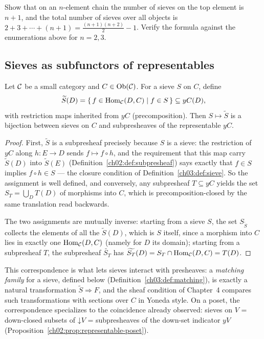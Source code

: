 \begin{exercise}\label{ch03:exr:sieve-count-chain}
Show that on an $n$-element chain the number of sieves on the top
element is $n + 1$, and the total number of sieves over all objects
is $2 + 3 + \cdots + (n+1) = \frac{(n+1)(n+2)}{2} - 1$. Verify the
formula against the enumerations above for $n = 2, 3$.
\end{exercise}

\subsection{Sieves as subfunctors of representables}\label{ch03:sec:sieve-subfunctor}

\begin{proposition}\label{ch03:prop:sieve-subfunctor}
Let $\mathcal{C}$ be a small category and $C \in \mathrm{Ob}(\mathcal{C})$. For a sieve $S$
on $C$, define
\[
\widetilde{S}(D) = \{\, f \in \mathrm{Hom}_{\mathcal{C}}(D, C) \mid f \in S \,\}
\subseteq yC(D),
\]
with restriction maps inherited from $yC$ (precomposition). Then
$S \mapsto \widetilde{S}$ is a bijection between sieves on $C$ and
subpresheaves of the representable $yC$.
\end{proposition}

\begin{proof}
First, $\widetilde{S}$ is a subpresheaf precisely because $S$ is a
sieve: the restriction of $yC$ along $h : E \to D$ sends
$f \mapsto f \circ h$, and the requirement that this map carry
$\widetilde{S}(D)$ into $\widetilde{S}(E)$
(Definition~\ref{ch02:def:subpresheaf}) says exactly that
$f \in S$ implies $f \circ h \in S$ --- the closure condition of
Definition~\ref{ch03:def:sieve}. So the assignment is well defined,
and conversely, any subpresheaf $T \subseteq yC$ yields the set
$S_T = \bigcup_D T(D)$ of morphisms into $C$, which is
precomposition-closed by the same translation read backwards.

The two assignments are mutually inverse: starting from a sieve $S$,
the set $S_{\widetilde{S}}$ collects the elements of all the
$\widetilde{S}(D)$, which is $S$ itself, since a morphism into $C$
lies in exactly one $\mathrm{Hom}_{\mathcal{C}}(D, C)$ (namely for $D$ its domain);
starting from a subpresheaf $T$, the subpresheaf
$\widetilde{S_T}$ has $\widetilde{S_T}(D) = S_T \cap
\mathrm{Hom}_{\mathcal{C}}(D, C) = T(D)$.
\end{proof}

This correspondence is what lets sieves interact with presheaves: a
\emph{matching family} for a sieve, defined below
(Definition~\ref{ch03:def:matching}), is exactly a natural
transformation $\widetilde{S} \Rightarrow F$, and the sheaf condition
of Chapter~4 compares such transformations with sections over $C$ in
Yoneda style. On a poset, the correspondence specializes to the
coincidence already observed: sieves on $V$ = down-closed subsets of
$\mathord{\downarrow} V$ = subpresheaves of the down-set indicator
$yV$ (Proposition~\ref{ch02:prop:representable-poset}).

